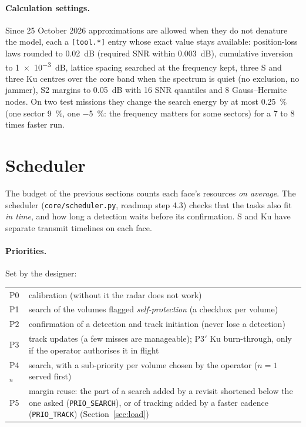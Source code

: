 \documentclass[11pt,a4paper]{article}
\newcommand{\code}[1]{\texttt{\small #1}}
\begin{document}
\paragraph{Calculation settings.} Since 25 October 2026 approximations are allowed when they do not denature the model,
each a \code{[tool.*]} entry whose exact value stays available: position-loss laws rounded to \SI{0.02}{dB} (required
SNR within \SI{0.003}{dB}), cumulative inversion to \SI{1e-3}{dB}, lattice spacing searched at the frequency kept,
three S and three Ku centres over the core band when the spectrum is quiet (no exclusion, no jammer), S2 margins to
\SI{0.05}{dB} with 16 SNR quantiles and 8 Gauss--Hermite nodes. On two test missions they change the search energy by
at most \SI{+0.25}{\percent} (one sector \SI{+9}{\percent}, one \SI{-5}{\percent}: the frequency matters for some
sectors) for a 7 to 8 times faster run.

\section{Scheduler}\label{sec:sched}
The budget of the previous sections counts each face's resources \emph{on average}. The scheduler
(\code{core/scheduler.py}, roadmap step 4.3) checks that the tasks also fit \emph{in time}, and how long a detection
waits before its confirmation. S and Ku have separate transmit timelines on each face.

\paragraph{Priorities.} Set by the designer:
\begin{center}
\begin{tabularx}{\linewidth}{@{}lL@{}}
\toprule
P0 & calibration (without it the radar does not work)\\
P1 & search of the volumes flagged \emph{self-protection} (a checkbox per volume)\\
P2 & confirmation of a detection and track initiation (never lose a detection)\\
P3 & track updates (a few misses are manageable); P3$'$ Ku burn-through, only if the operator authorises it in flight\\
P4$_n$ & search, with a sub-priority per volume chosen by the operator ($n = 1$ served first)\\
P5 & margin reuse: the part of a search added by a revisit shortened below the one asked (\code{PRIO\_SEARCH}), or of
tracking added by a faster cadence (\code{PRIO\_TRACK}) (Section~\ref{sec:load})\\
\bottomrule
\end{tabularx}
\end{center}
\end{document}
